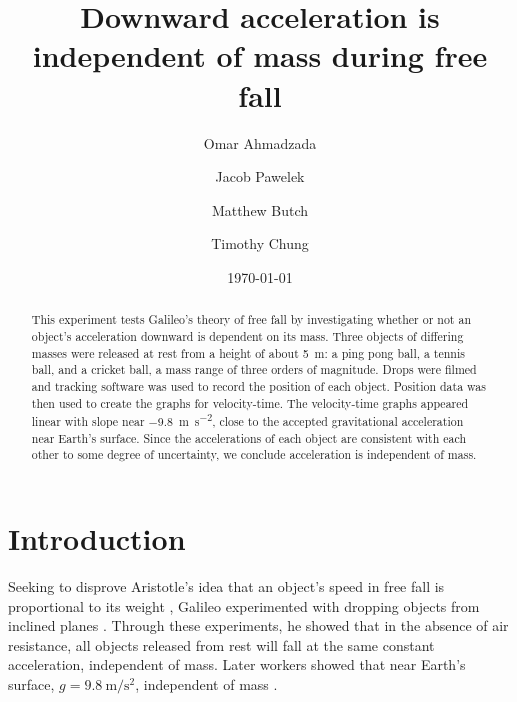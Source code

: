 \documentclass[reprint,amsmath,amssymb,aps,twoside]{revtex4-2}
\begin{document}
\setcounter{page}{44}

\title{Downward acceleration is independent of mass during free fall}
\author{Omar Ahmadzada}
\author{Jacob Pawelek}
\author{Matthew Butch}
\author{Timothy Chung}
\date{\today}

\begin{abstract}
This experiment tests Galileo’s theory of free fall by investigating whether or not an object's acceleration downward is dependent on its mass. Three objects of differing masses were released at rest from a height of about \qty{5}{\meter}: a ping pong ball, a tennis ball, and a cricket ball, a mass range of three orders of magnitude. Drops were filmed and tracking software was used to record the position of each object. Position data was then used to create the graphs for velocity-time. The velocity-time graphs appeared linear with slope near \qty{-9.8}{\meter\per\second\squared}, close to the accepted gravitational acceleration near Earth’s surface. Since the accelerations of each object are consistent with each other to some degree of uncertainty, we conclude acceleration is independent of mass. 
\end{abstract}


\maketitle\thispagestyle{mytitlepage}



\section{Introduction}
Seeking to disprove Aristotle’s idea that an object’s speed in free fall is proportional to its weight \cite{aristotle:physics}, Galileo experimented with dropping objects from inclined planes \cite{galilei:1638:discorsi, machamer:2021:galileo}. Through these experiments, he showed that in the absence of air resistance, all objects released from rest will fall at the same constant acceleration, independent of mass. Later workers showed that near Earth's surface, $g=\qty{9.8}{\meter\per\second\squared}$, independent of mass \cite{barth:2020:galileo, tipler, openstax, barrons}. 
\end{document}
